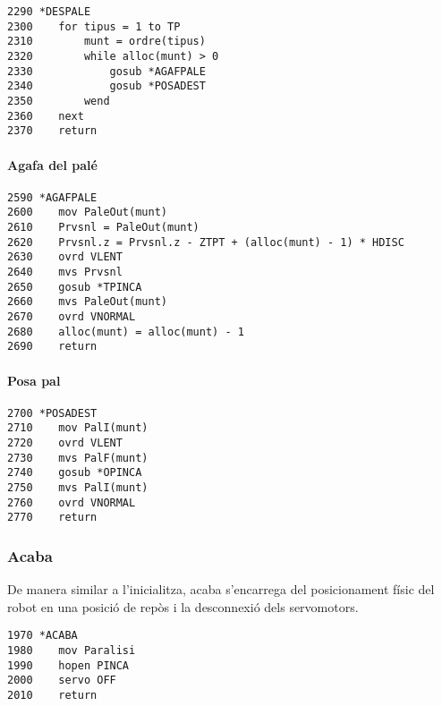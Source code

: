 \begin{verbatim}
2290 *DESPALE
2300    for tipus = 1 to TP
2310        munt = ordre(tipus)
2320        while alloc(munt) > 0
2330            gosub *AGAFPALE
2340            gosub *POSADEST
2350        wend
2360    next
2370    return
\end{verbatim}

\paragraph{Agafa del palé}
\begin{verbatim}
2590 *AGAFPALE
2600    mov PaleOut(munt)
2610    Prvsnl = PaleOut(munt)
2620    Prvsnl.z = Prvsnl.z - ZTPT + (alloc(munt) - 1) * HDISC
2630    ovrd VLENT
2640    mvs Prvsnl
2650    gosub *TPINCA
2660    mvs PaleOut(munt)
2670    ovrd VNORMAL
2680    alloc(munt) = alloc(munt) - 1
2690    return
\end{verbatim}

\paragraph{Posa pal}
\begin{verbatim}
2700 *POSADEST
2710    mov PalI(munt)
2720    ovrd VLENT
2730    mvs PalF(munt)
2740    gosub *OPINCA
2750    mvs PalI(munt)
2760    ovrd VNORMAL
2770    return
\end{verbatim}

\subsubsection{Acaba}
De manera similar a l'inicialitza, acaba s'encarrega del posicionament
físic del robot en una posició de repòs i la desconnexió dels servomotors.

\begin{verbatim}
1970 *ACABA
1980    mov Paralisi
1990    hopen PINCA
2000    servo OFF
2010    return
\end{verbatim}

